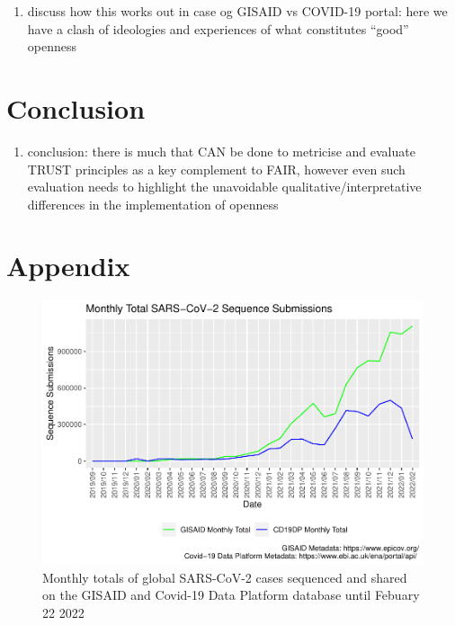 \documentclass{article}
\providecommand{\tightlist}{%
  \setlength{\itemsep}{0pt}\setlength{\parskip}{0pt}}
\begin{document}
\begin{enumerate}
\def\labelenumi{(\arabic{enumi})}
\setcounter{enumi}{4}
\tightlist
\item
  discuss how this works out in case og GISAID vs COVID-19 portal: here
  we have a clash of ideologies and experiences of what constitutes
  ``good'' openness
\end{enumerate}

\hypertarget{conclusion}{%
\section{Conclusion}\label{conclusion}}

\begin{enumerate}
\def\labelenumi{(\arabic{enumi})}
\setcounter{enumi}{5}
\tightlist
\item
  conclusion: there is much that CAN be done to metricise and evaluate
  TRUST principles as a key complement to FAIR, however even such
  evaluation needs to highlight the unavoidable
  qualitative/interpretative differences in the implementation of
  openness
\end{enumerate}

\hypertarget{appendix}{%
\section{Appendix}\label{appendix}}

\begin{figure}
\centering
\includegraphics{Report_files/figure-latex/fig2-1.pdf}
\caption{Monthly totals of global SARS-CoV-2 cases sequenced and shared
on the GISAID and Covid-19 Data Platform database until Febuary 22 2022}
\end{figure}
\end{document}
